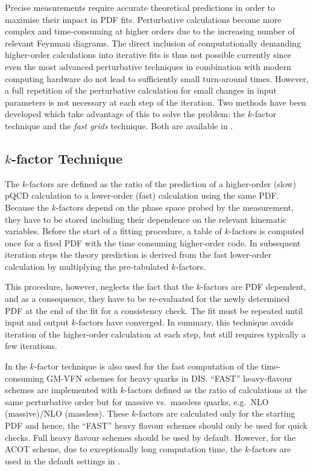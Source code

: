 
Precise measurements
require accurate theoretical predictions in
order to maximise their impact in PDF fits.  Perturbative
calculations become more complex and time-consuming at higher  
orders due to the increasing number of relevant Feynman diagrams.
The direct inclusion of computationally
demanding higher-order calculations into iterative fits is thus
not possible currently since even the most advanced perturbative techniques in
combination with modern computing hardware do not lead to sufficiently
small turn-around times. However, a full repetition of the
perturbative calculation for small changes in input parameters is
not necessary at each step of the iteration.
Two methods have been developed which take advantage of this
to solve the problem: the $k$-factor technique and the
\emph{fast grids} technique. Both are available in \fitter.

\subsection{$k$-factor Technique}
  The $k$-factors are defined as the ratio of the prediction of a
  higher-order (slow) pQCD calculation to a lower-order (fast)
  calculation using the same PDF. Because the $k$-factors depend on the phase space
  probed by the measurement, they have to be stored  
including their dependence on
  the relevant kinematic variables. Before the start of  
  a fitting procedure, a table of $k$-factors is computed once
  for a fixed PDF with the time consuming higher-order code. In
  subsequent iteration steps the theory prediction is derived from the
  fast lower-order calculation by multiplying the pre-tabulated
  $k$-factors.

  This procedure, however, neglects the fact that the $k$-factors are 
  PDF dependent, and 
  as a consequence, they have to be re-evaluated
  for the newly determined PDF at the end of the fit for a consistency
  check. The fit must be repeated until input and output
  $k$-factors have converged. In summary, this technique avoids
  iteration of the higher-order calculation at each step, but still
  requires typically a few iterations.

In \fitter the $k$-factor technique is also used for the fast 
computation of the time-consuming GM-VFN schemes for heavy quarks in DIS.
``FAST'' heavy-flavour schemes are implemented
with $k$-factors defined as the ratio of
calculations at the same perturbative order but for massive vs.\
massless quarks, e.g.\ NLO (massive)/NLO (massless).
These $k$-factors are calculated only for the
starting PDF and hence, the ``FAST'' heavy flavour schemes should
only be used for quick checks. Full heavy flavour schemes
should be used by default. However, for the ACOT scheme,
due to exceptionally long computation time, the $k$-factors are used in 
the default settings in \fitter. 

